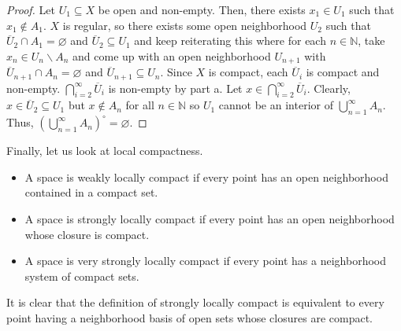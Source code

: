 \documentclass[12pt,reqno]{amsart}
\numberwithin{theorem}{section}
\theoremstyle{definition}
\theoremstyle{remark}
\numberwithin{equation}{section}
\theoremstyle{definition}
\begin{document}
\begin{proof}
    Let $U_1 \subseteq X$ be open and non-empty. Then, there exists $x_1 \in U_1$ such that $x_1 \notin A_1$. $X$ is regular, so there exists some open neighborhood $U_2$ such that $\overline U_2 \cap A_1 = \varnothing$ and $\overline U_2 \subseteq U_1$ and keep reiterating this where for each $n \in \mathbb N$, take $x_n \in U_n \backslash A_n$ and come up with an open neighborhood $U_{n+1}$ with $\overline U_{n+1}\cap A_n = \varnothing$ and $\overline U_{n+1}\subseteq U_n$. Since $X$ is compact, each $\overline U_i$ is compact and non-empty. $\bigcap_{i=2}^\infty \overline U_i$ is non-empty by part a. Let $x \in \bigcap_{i=2}^\infty \overline U_i$. Clearly, $x \in \overline U_2 \subseteq  U_1$ but $x \notin A_n$ for all $n \in \mathbb N$ so $U_1$ cannot be an interior of $\bigcup_{n=1}^\infty A_n$. Thus, $(\bigcup_{n=1}^\infty A_n)^\circ = \varnothing$.
\end{proof}

Finally, let us look at local compactness. 
\begin{definition}
\begin{itemize}
    \item A space is weakly locally compact if every point has an open neighborhood contained in a compact set.
    \item 
    A space is strongly locally compact if every point has an open neighborhood whose closure is compact.
    \item A space is very strongly locally compact if every point has a neighborhood system of compact sets.
\end{itemize}
\end{definition}
It is clear that the definition of strongly locally compact is equivalent to every point having a neighborhood basis of open sets whose closures are compact.
\end{document}
